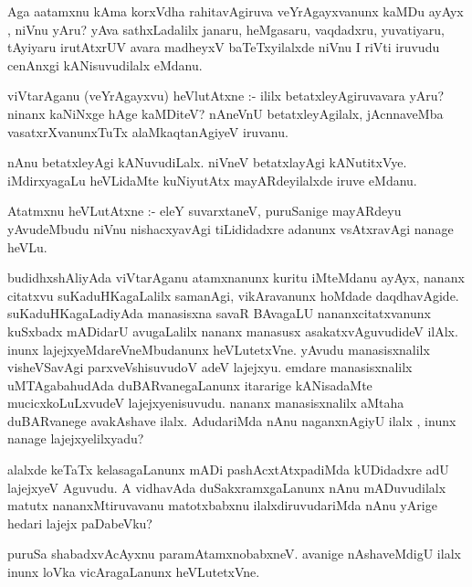 \documentclass{article}
\begin{document}
\begin{mn}
Aga aatamxnu kAma korxVdha rahitavAgiruva veYrAgayxvanunx  kaMDu ayAyx ,
 niVnu yAru?  yAva sathxLadalilx janaru, heMgasaru, vaqdadxru, yuvatiyaru,
 tAyiyaru irutAtxrUV avara madheyxV baTeTxyilalxde niVnu I riVti iruvudu
 cenAnxgi kANisuvudilalx eMdanu. 
\end{mn}

\begin{mn}
viVtarAganu (veYrAgayxvu) heVlutAtxne :- ililx betatxleyAgiruvavara yAru? 
ninanx kaNiNxge hAge kaMDiteV?  nAneVnU betatxleyAgilalx, jAcnnaveMba 
vasatxrXvanunxTuTx alaMkaqtanAgiyeV iruvanu.
\end{mn}

\begin{mn}
nAnu betatxleyAgi kANuvudiLalx. niVneV betatxlayAgi kANutitxVye. iMdirxyagaLu
 heVLidaMte kuNiyutAtx  mayARdeyilalxde iruve eMdanu.
\end{mn}

\begin{mn}
Atatmxnu heVLutAtxne :- eleY suvarxtaneV, puruSanige  mayARdeyu yAvudeMbudu
niVnu nishacxyavAgi tiLididadxre adanunx vsAtxravAgi nanage heVLu.
\end{mn}

\begin{mn}
budidhxshAliyAda viVtarAganu atamxnanunx kuritu iMteMdanu ayAyx, nananx 
citatxvu suKaduHKagaLalilx  samanAgi, vikAravanunx hoMdade daqdhavAgide.  
suKaduHKagaLadiyAda manasisxna savaR BAvagaLU nananxcitatxvanunx kuSxbadx
mADidarU avugaLalilx nananx manasusx asakatxvAguvudideV ilAlx. inunx
lajejxyeMdareVneMbudanunx heVLutetxVne.  yAvudu manasisxnalilx visheVSavAgi 
parxveVshisuvudoV adeV lajejxyu.  emdare manasisxnalilx uMTAgabahudAda 
duBARvanegaLanunx itararige kANisadaMte mucicxkoLuLxvudeV lajejxyenisuvudu. 
 nananx manasisxnalilx  aMtaha duBARvanege avakAshave ilalx.  AdudariMda 
 nAnu naganxnAgiyU ilalx , inunx nanage lajejxyelilxyadu?
\end{mn}

\begin{mn}
alalxde keTaTx kelasagaLanunx mADi pashAcxtAtxpadiMda kUDidadxre adU lajejxyeV 
Aguvudu.  A vidhavAda duSakxramxgaLanunx nAnu mADuvudilalx matutx  nananxMtiruvavanu 
matotxbabxnu  ilalxdiruvudariMda nAnu yArige hedari lajejx paDabeVku?
\end{mn}

\begin{mn}
puruSa shabadxvAcAyxnu  paramAtamxnobabxneV. avanige nAshaveMdigU ilalx  
inunx loVka vicAragaLanunx heVLutetxVne.
\end{mn}
\end{document}
